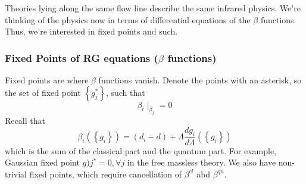 \documentclass[11pt, oneside]{article}   	%
\theoremstyle{slanted}
\begin{document}
Theories lying along the 
same flow line describe the same infrared
physics. 
We're thinking of the physics 
now in terms of differential equations 
of the $ \beta $ functions. Thus, we're 
interested in fixed points and such.

\subsubsection{Fixed Points of RG equations ($\beta $ functions)}
Fixed points are where 
$ \beta $ functions vanish.
Denote the points with an 
asterisk, so the set of fixed point $ \left\{  g ^ *_ j  \right\}  $, 
such that 
\[
\beta _ i \mid_{ \beta _ j }  =0 
\] Recall that 
\[
\beta _ i \left( \left\{  g _ i  \right\}   \right)  
= \left( d _ i - d  \right)  + \Lambda \frac{d g _ i }{ d \Lambda } \left( 
\left\{  g _ i  \right\} \right) 
\] which is the sum of the classical 
part and the quantum part. 
For example, Gaussian fixed point
$ g ) j ^{ * }   =0 , \forall j $
in the free massless theory. 
We also have non-trivial fixed points, 
which require cancellation of $ \beta ^{ cl} $ abd 
$ \beta ^{ qu }  $. 
\end{document}
